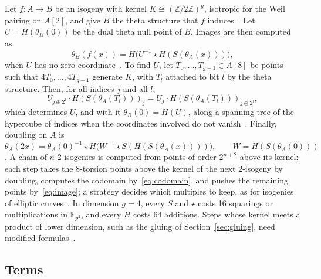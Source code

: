 \documentclass[version=preprint]{iacrcc}
\begin{document}
    Let $f \colon A \to B$ be an isogeny with kernel $K \cong
    (\mathbb{Z}/2\mathbb{Z})^g$, isotropic for the Weil pairing on $A[2]$, and
    give $B$ the theta structure that $f$ induces~\cite[Section 4]{Dar24}. Let
    $U = H(\theta_B(0))$ be the dual theta null point of $B$. Images are then
    computed as
    \begin{equation}
        \label{eq:image}
        \theta_B(f(x)) = H\bigl(U^{-1} \star H(S(\theta_A(x)))\bigr),
    \end{equation}
    when $U$ has no zero coordinate~\cite[Algorithm 1]{Dar24}. To find $U$, let
    $T_0, \ldots, T_{g-1} \in A[8]$ be points such that $4T_0, \ldots, 4T_{g-1}$
    generate $K$, with $T_l$ attached to bit $l$ by the theta structure. Then,
    for all indices $j$ and all $l$,
    \begin{equation}
        \label{eq:codomain}
        U_{j \oplus 2^l} \cdot H(S(\theta_A(T_l)))_j = U_j \cdot
        H(S(\theta_A(T_l)))_{j \oplus 2^l},
    \end{equation}
    which determines $U$, and with it $\theta_B(0) = H(U)$, along a spanning tree
    of the hypercube of indices when the coordinates involved do not
    vanish~\cite[Algorithms 2--4 and Remark 17]{Dar24}. Finally, doubling on $A$
    is
    \begin{equation}
        \label{eq:double}
        \theta_A(2x) = \theta_A(0)^{-1} \star H\bigl(W^{-1} \star
        S(H(S(\theta_A(x))))\bigr), \qquad W = H(S(\theta_A(0)))
    \end{equation}
    \cite[Algorithm 8]{Dar24}. A chain of $n$ 2-isogenies is computed from
    points of order $2^{n+2}$ above its kernel: each step takes the 8-torsion
    points above the kernel of the next 2-isogeny by doubling, computes the
    codomain by~\eqref{eq:codomain}, and pushes the remaining points
    by~\eqref{eq:image}; a strategy decides which multiples to keep, as for
    isogenies of elliptic curves~\cite{DLRW24}. In dimension $g = 4$, every $S$
    and $\star$ costs 16 squarings or multiplications in $\mathbb{F}_{p^2}$, and
    every $H$ costs 64 additions. Steps whose kernel meets a product of lower
    dimension, such as the gluing of Section~\ref{sec:gluing}, need modified
    formulas~\cite[Section 4.3]{Dar24}.

    \subsection{Terms}
    \label{sec:glossary}
\end{document}
